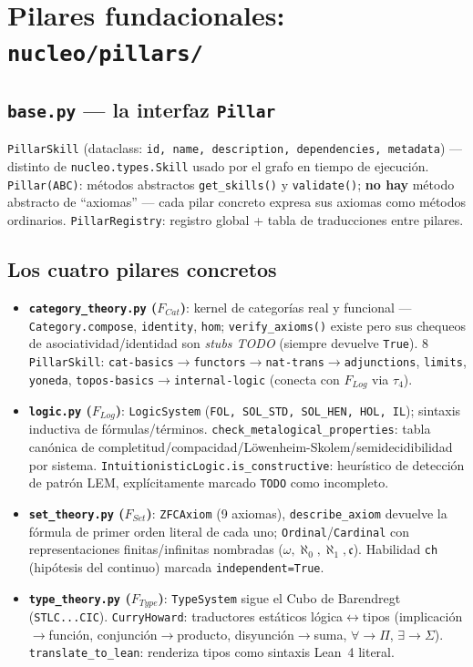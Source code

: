 \documentclass[11pt,a4paper]{report}
\newcommand{\code}[1]{\texttt{#1}}
\begin{document}
\chapter{Pilares fundacionales: \code{nucleo/pillars/}}

\section{\code{base.py} --- la interfaz \code{Pillar}}

\code{PillarSkill} (dataclass: \code{id, name, description, dependencies, metadata}) --- distinto de \code{nucleo.types.Skill} usado por el grafo en tiempo de ejecuci\'on. \code{Pillar(ABC)}: m\'etodos abstractos \code{get_skills()} y \code{validate()}; \textbf{no hay} m\'etodo abstracto de ``axiomas'' --- cada pilar concreto expresa sus axiomas como m\'etodos ordinarios. \code{PillarRegistry}: registro global + tabla de traducciones entre pilares.

\section{Los cuatro pilares concretos}

\begin{itemize}
  \item \textbf{\code{category_theory.py} ($F_{Cat}$)}: kernel de categor\'ias real y funcional --- \code{Category.compose}, \code{identity}, \code{hom}; \code{verify_axioms()} existe pero sus chequeos de asociatividad/identidad son \emph{stubs TODO} (siempre devuelve \code{True}). 8 \code{PillarSkill}: \code{cat-basics$\to$functors$\to$nat-trans$\to$adjunctions}, \code{limits}, \code{yoneda}, \code{topos-basics$\to$internal-logic} (conecta con $F_{Log}$ via $\tau_4$).
  \item \textbf{\code{logic.py} ($F_{Log}$)}: \code{LogicSystem} (\code{FOL, SOL\_STD, SOL\_HEN, HOL, IL}); sintaxis inductiva de f\'ormulas/t\'erminos. \code{check_metalogical_properties}: tabla can\'onica de completitud/compacidad/L\"owenheim-Skolem/semidecidibilidad por sistema. \code{IntuitionisticLogic.is_constructive}: heur\'istico de detecci\'on de patr\'on LEM, expl\'icitamente marcado \code{TODO} como incompleto.
  \item \textbf{\code{set_theory.py} ($F_{Set}$)}: \code{ZFCAxiom} (9 axiomas), \code{describe_axiom} devuelve la f\'ormula de primer orden literal de cada uno; \code{Ordinal}/\code{Cardinal} con representaciones finitas/infinitas nombradas ($\omega,\aleph_0,\aleph_1,\mathfrak{c}$). Habilidad \code{ch} (hip\'otesis del continuo) marcada \code{independent=True}.
  \item \textbf{\code{type_theory.py} ($F_{Type}$)}: \code{TypeSystem} sigue el Cubo de Barendregt (\code{STLC...CIC}). \code{CurryHoward}: traductores est\'aticos l\'ogica$\leftrightarrow$tipos (implicaci\'on$\to$funci\'on, conjunci\'on$\to$producto, disyunci\'on$\to$suma, $\forall\to\Pi$, $\exists\to\Sigma$). \code{translate_to_lean}: renderiza tipos como sintaxis Lean~4 literal.
\end{itemize}
\end{document}

